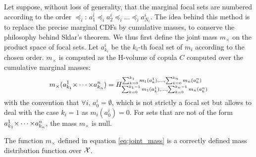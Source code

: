 Let suppose, without loss of generality, that the marginal focal sets are numbered according to the order $\preceq_i$: $a^i_1\preceq_ia^i_2\preceq_i\dots\preceq_i a^i_{N_i}$. The idea behind this method is to replace the precise marginal CDFs by cumulative masses, to conserve the philosophy behind Sklar's theorem. We thus first define the joint mass $m_\times$ on the product space of focal sets. Let $a_{k_i}^i$ be the $k_i$-th focal set of $m_i$ according to the chosen order. $m_\times$ is computed as the H-volume of copula $C$ computed over the cumulative marginal masses:
\begin{eqnarray}\label{eq:joint_mass}
    m_\times(a^1_{k_1}{\times\dots\times} a^n_{k_n}) = H_{\sum_{k=0}^{k_1-1}m_1(a^1_k), \dots, \sum_{k=0}^{k_n-1}m_n(a^n_k)}^{\sum_{k=0}^{k_1}m_1(a^1_k), \dots, \sum_{k=0}^{k_n}m_n(a^n_k)}
\end{eqnarray}
with the convention that $\forall i,\, a^i_0=\emptyset$, which is not strictly a focal set but allows to deal with the case $k_i=1$ as $m_i(a^i_0)=0$. For sets that are not of the form $a^1_{k_1}{\times\dots\times} a^n_{k_n}$, the mass $m_\times$ is null.
\begin{proposition}
    The function $m_\times$ defined in equation \eqref{eq:joint_mass} is a correctly defined mass distribution function over ${\mathcal{X}}$. 
\end{proposition}
